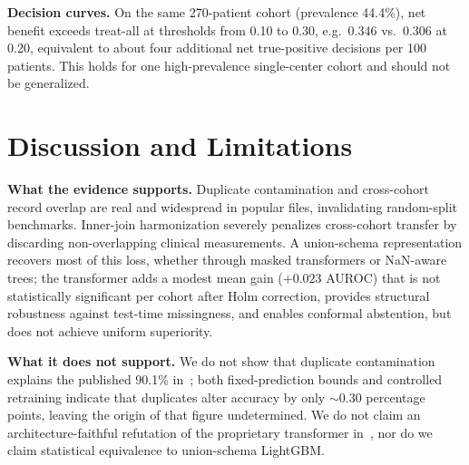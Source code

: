 \documentclass[journal]{IEEEtran}
\begin{document}
\textbf{Decision curves.} On the same 270-patient cohort (prevalence 44.4\%), net benefit exceeds treat-all at thresholds from 0.10 to 0.30, e.g.\ 0.346 vs.\ 0.306 at 0.20, equivalent to about four additional net true-positive decisions per 100 patients. This holds for one high-prevalence single-center cohort and should not be generalized.

\section{Discussion and Limitations}\label{sec:discussion}
\textbf{What the evidence supports.} Duplicate contamination and cross-cohort record overlap are real and widespread in popular files, invalidating random-split benchmarks. Inner-join harmonization severely penalizes cross-cohort transfer by discarding non-overlapping clinical measurements. A union-schema representation recovers most of this loss, whether through masked transformers or NaN-aware trees; the transformer adds a modest mean gain ($+0.023$ AUROC) that is not statistically significant per cohort after Holm correction, provides structural robustness against test-time missingness, and enables conformal abstention, but does not achieve uniform superiority.

\textbf{What it does not support.} We do not show that duplicate contamination explains the published 90.1\% in~\cite{mahmud2026}; both fixed-prediction bounds and controlled retraining indicate that duplicates alter accuracy by only $\sim$0.30 percentage points, leaving the origin of that figure undetermined. We do not claim an architecture-faithful refutation of the proprietary transformer in~\cite{mahmud2026}, nor do we claim statistical equivalence to union-schema LightGBM.
\end{document}

